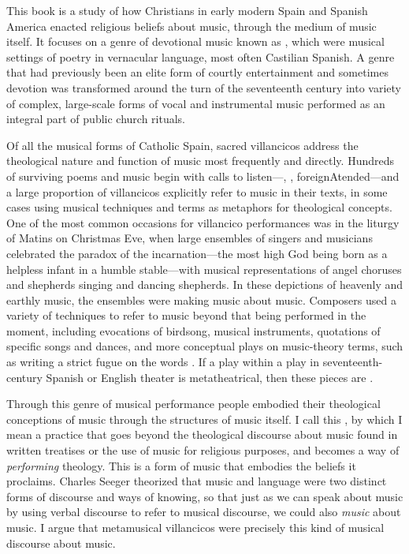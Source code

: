 This book is a study of how Christians in early modern Spain and Spanish
America enacted religious beliefs about music, through the medium of music
itself.
It focuses on a genre of devotional music known as , which
were musical settings of poetry in vernacular language, most often Castilian
Spanish.
A genre that had previously been an elite form of courtly entertainment and
sometimes devotion was transformed around the turn of the seventeenth century
into variety of complex, large-scale forms of vocal and instrumental music
performed as an integral part of public church rituals.%
    \Autocites
    [See overview and bibliography in][]{Cashner:WLSCM32}
    {Laird:VC}
    {Torrente:VC-chapter}
    {Knighton-Torrente:VCs}
    {Borrego-Marin:Villancico}
    {CaberoPueyo:PhD}
    {Cashner:PhD}
    {Swadley:VillancicoPhD}
    {ChavezBarcenas:PhD}

Of all the musical forms of Catholic Spain, sacred villancicos address the
theological nature and function of music most frequently and directly.
Hundreds of surviving poems and music begin with calls to
listen---, , foreign{Atended}---and a large
proportion of villancicos explicitly refer to music in their texts, in some
cases using musical techniques and terms as metaphors for theological concepts.
One of the most common occasions for villancico performances was in the liturgy
of Matins on Christmas Eve, when large ensembles of singers and musicians
celebrated the paradox of the incarnation---the most high God being born
as a helpless infant in a humble stable---with musical representations of
angel choruses and shepherds singing and dancing shepherds.
In these depictions of heavenly and earthly music, the ensembles were making
music about music.
Composers used a variety of techniques to refer to music beyond that being
performed in the moment, including evocations of birdsong, musical instruments,
quotations of specific songs and dances, and more conceptual plays on
music-theory terms, such as writing a strict fugue on the words
.
If a play within a play in seventeenth-century Spanish or English theater is
metatheatrical, then these pieces are .

Through this genre of musical performance people embodied their theological
conceptions of music through the structures of music itself.
I call this , by which I mean a practice that goes
beyond the theological discourse about music found in written treatises or the
use of music for religious purposes, and becomes a way of \emph{performing}
theology.
This is a form of music that embodies the beliefs it proclaims.
Charles Seeger theorized that music and language were two distinct forms of
discourse and ways of knowing, so that just as we can speak about music by
using verbal discourse to refer to musical discourse, we could also
\emph{music} about music.%
    \Autocites
    {Seeger:Unitary}
    {Small:Musicking}
I argue that metamusical villancicos were precisely this kind of musical
discourse about music.

